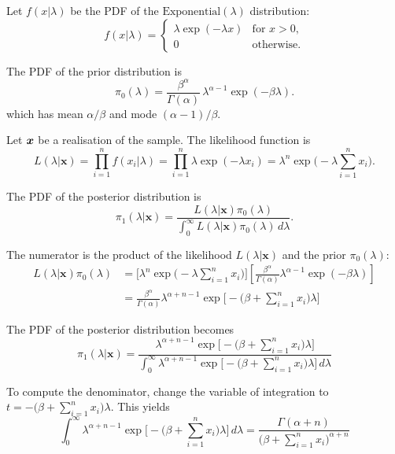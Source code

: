 \begin{solution}
Let $f(x|\lambda)$ be the PDF of the $\text{Exponential}(\lambda)$ distribution:
\[
f(x|\lambda) = \left\{\begin{array}{ll}
	\lambda\exp(-\lambda x) & \text{for $x>0$}, \\
	0							& \text{otherwise.}
\end{array}\right.
\]

The PDF of the prior distribution is
\[
\pi_0(\lambda) = 	\frac{\beta^{\alpha}}{\Gamma(\alpha)}\,\lambda^{\alpha-1}\exp(-\beta\lambda).
\]
which has mean $\alpha/\beta$ and mode $(\alpha-1)/\beta$.

Let $\boldsymbol{x}$ be a realisation of the sample. The likelihood function is
\[
L(\lambda|\mathbf{x}) 
	= \prod_{i=1}^n f(x_i|\lambda)
	= \prod_{i=1}^n \lambda\exp(-\lambda x_i)
	= \lambda^n \exp\Big(-\lambda\textstyle\sum_{i=1}^n  x_i\Big).
\]

The PDF of the posterior distribution is
\[
\pi_1(\lambda|\mathbf{x})	
	= \frac{L(\lambda|\mathbf{x})\pi_0(\lambda)}{\displaystyle\int_0^{\infty} L(\lambda|\mathbf{x})\pi_0(\lambda)\,d\lambda}.
\]

The numerator is the product of the likelihood $L(\lambda|\mathbf{x})$ and the prior $\pi_0(\lambda)$:
\begin{align*}
L(\lambda|\mathbf{x})\pi_0(\lambda)
	& = \Big[\lambda^n \exp\big(-\lambda\textstyle\sum_{i=1}^n  x_i\big)\Big]\left[\displaystyle\frac{\beta^{\alpha}}{\Gamma(\alpha)}\lambda^{\alpha-1}\exp(-\beta\lambda)\right] \\[1ex]
	& = \frac{\beta^{\alpha}}{\Gamma(\alpha)} \lambda^{\alpha+n-1}\exp\Big[-\big(\beta+\textstyle\sum_{i=1}^n x_i\big)\lambda\Big]
\end{align*}


The PDF of the posterior distribution becomes
\[
\pi_1(\lambda|\mathbf{x})	
	= \frac{\lambda^{\alpha+n-1}\exp\Big[-\big(\beta+\sum_{i=1}^n x_i\big)\lambda\Big]}
		{\displaystyle\int_0^{\infty} \lambda^{\alpha+n-1}\exp\Big[-\big(\beta+\sum_{i=1}^n x_i\big)\lambda\Big]\,d\lambda}
\]

To compute the denominator, change the variable of integration to $t = -\big(\beta+\sum_{i=1}^n x_i\big)\lambda$. This yields
\[
\int_0^{\infty} \lambda^{\alpha+n-1}\exp\Big[-\big(\beta+\textstyle\sum_{i=1}^n x_i\big)\lambda\Big]\,d\lambda 
	= \displaystyle\frac{\Gamma(\alpha+n)}{\big(\beta+\sum_{i=1}^n x_i\big)^{\alpha+n}}
\]


\end{solution}
